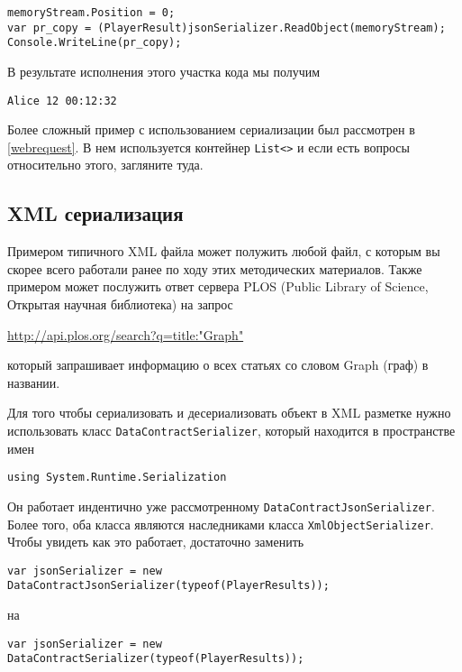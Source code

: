 \begin{verbatim}
memoryStream.Position = 0;
var pr_copy = (PlayerResult)jsonSerializer.ReadObject(memoryStream);
Console.WriteLine(pr_copy);
\end{verbatim}

В результате исполнения этого участка кода мы получим

\begin{verbatim}
Alice 12 00:12:32
\end{verbatim}

Более сложный пример с использованием сериализации был рассмотрен в \ref{webrequest}. В нем используется контейнер \texttt{List<>} и если есть вопросы относительно этого, загляните туда.

\subsection{XML сериализация}

Примером типичного XML файла может полужить любой  файл, с которым вы скорее всего работали ранее по ходу этих методических материалов. Также примером может послужить ответ сервера PLOS (Public Library of Science, Открытая научная библиотека) на запрос

\url{http://api.plos.org/search?q=title:"Graph"}

который запрашивает информацию о всех статьях со словом Graph (граф) в названии.  

Для того чтобы сериализовать и десериализовать объект в XML разметке нужно использовать класс \texttt{DataContractSerializer}, который находится  в пространстве имен

\begin{verbatim}
using System.Runtime.Serialization
\end{verbatim}

Он работает индентично уже рассмотренному \texttt{DataContractJsonSerializer}. Более того, оба класса являются наследниками класса \texttt{XmlObjectSerializer}. Чтобы увидеть как это работает, достаточно заменить

\begin{verbatim}
var jsonSerializer = new DataContractJsonSerializer(typeof(PlayerResults));
\end{verbatim}

на 

\begin{verbatim}
var jsonSerializer = new DataContractSerializer(typeof(PlayerResults));
\end{verbatim}

